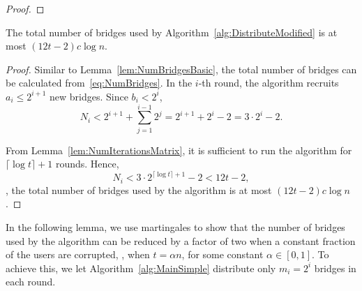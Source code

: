 \begin{proof}
\end{proof}

\begin{lemma} \label{lem:NumBridgesMatrix}
	The total number of bridges used by Algorithm~\ref{alg:DistributeModified} is at most ${(12t - 2)c\log{n}}$.
\end{lemma}
\begin{proof}
	Similar to Lemma~\ref{lem:NumBridgesBasic}, the total number of bridges can be calculated from~\eqref{eq:NumBridges}.
	In the $i$-th round, the algorithm recruits ${a_i \leq 2^{i+1}}$ new bridges. Since ${b_i < 2^i}$,
	\[N_i < 2^{i+1} + \sum_{j=1}^{i-1} 2^j = 2^{i+1} + 2^{i} - 2 = 3 \cdot 2^i - 2.\]
	
	From Lemma~\ref{lem:NumIterationsMatrix}, it is sufficient to run the algorithm for ${\lceil \log{t} \rceil + 1}$ rounds. Hence,
	\[N_i < 3 \cdot 2^{\lceil \log{t} \rceil + 1} - 2 < 12t - 2,\]
	\ie, the total number of bridges used by the algorithm is at most ${(12t - 2)c\log{n}}$.
\end{proof}

In the following lemma, we use martingales to show that the number of bridges used by the algorithm can be reduced by a factor of two when a constant fraction of the users are corrupted, \ie, when ${t = \alpha n}$, for some constant ${\alpha \in [0,1]}$. To achieve this, we let Algorithm~\ref{alg:MainSimple} distribute only ${m_i = 2^i}$ bridges in each round.

